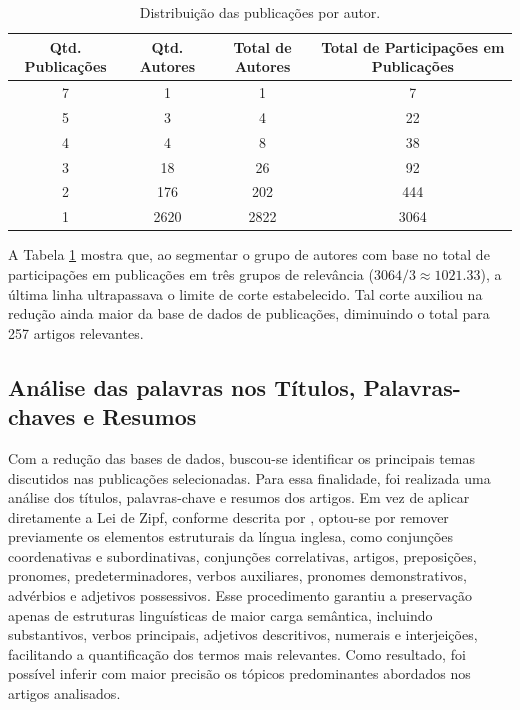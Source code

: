 \documentclass[openany,oneside,a4paper,9pt]{extarticle}
\begin{document}
\begin{table}[H]
    \centering
    \footnotesize
    \begin{tabular}{cccc}
        \hline
        Qtd. Publicações & Qtd. Autores & Total de Autores & Total de Participações em Publicações \\
        \hline
        \rowcolor{red!30} 7  & 1    & 1    & 7    \\
        \rowcolor{red!30} 5  & 3    & 4    & 22   \\
        \rowcolor{red!30} 4  & 4    & 8    & 38   \\
        \rowcolor{red!30} 3  & 18   & 26   & 92   \\
        \rowcolor{red!30} 2  & 176  & 202  & 444  \\
        1  & 2620 & 2822 & 3064  \\
        \hline
    \end{tabular}
    \caption{Distribuição das publicações por autor.}
    \label{tab:2}
\end{table}

A Tabela \ref{tab:2} mostra que, ao segmentar o grupo de autores com base no total de participações em publicações em três grupos de relevância ($3064/3\approx1021.33$), a última linha ultrapassava o limite de corte estabelecido. Tal corte auxiliou na redução ainda maior da base de dados de publicações, diminuindo o total para 257 artigos relevantes.

\subsection{Análise das palavras nos Títulos, Palavras-chaves e Resumos}

Com a redução das bases de dados, buscou-se identificar os principais temas discutidos nas publicações selecionadas. Para essa finalidade, foi realizada uma análise dos títulos, palavras-chave e resumos dos artigos. Em vez de aplicar diretamente a Lei de Zipf, conforme descrita por \textcite{guedes2005bibliometria}, optou-se por remover previamente os elementos estruturais da língua inglesa, como conjunções coordenativas e subordinativas, conjunções correlativas, artigos, preposições, pronomes, predeterminadores, verbos auxiliares, pronomes demonstrativos, advérbios e adjetivos possessivos. Esse procedimento garantiu a preservação apenas de estruturas linguísticas de maior carga semântica, incluindo substantivos, verbos principais, adjetivos descritivos, numerais e interjeições, facilitando a quantificação dos termos mais relevantes. Como resultado, foi possível inferir com maior precisão os tópicos predominantes abordados nos artigos analisados.
\end{document}
